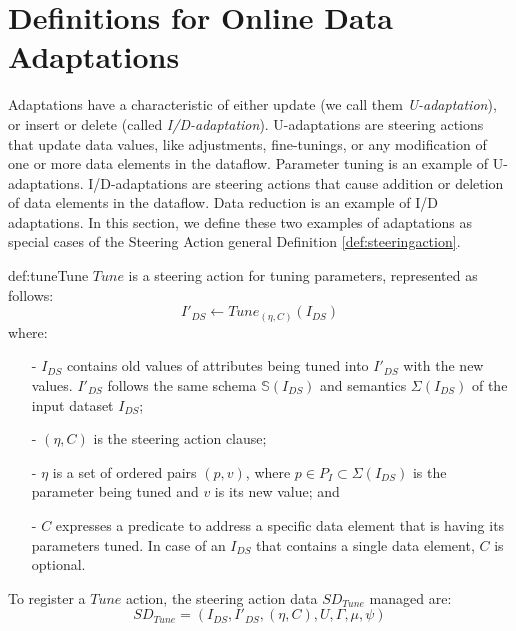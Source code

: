 \section{Definitions for Online Data Adaptations} \label{sec_online_data_adaptations}


Adaptations have a characteristic of either update (we call them \textit{U-adaptation}), or insert or delete (called \textit{I/D-adaptation}).
U-adaptations are steering actions that update data values, like adjustments, fine-tunings, or any modification of one or more data elements in the dataflow. Parameter tuning is an example of U-adaptations.
I/D-adaptations are steering actions that cause addition or deletion of data elements in the dataflow. Data reduction is an example of I/D adaptations. In this section, we define these two examples of adaptations as special cases of the Steering Action general Definition \ref{def:steeringaction}.

\begin{mydef}{def:tune}{Tune}
$Tune$ is a steering action for tuning parameters, represented as follows:
$$I'_{DS} \leftarrow Tune_{(\eta,C)}(I_{DS})$$
where:
\begin{itemize}
    \setlength\itemsep{-2mm}
    \item[-] \noindent
         $I_{DS}$ contains old values of attributes being tuned into $I'_{DS}$ with the new values.
         $I'_{DS}$ follows the same schema $\mathbb{S}(I_{DS})$ and semantics $\Sigma(I_{DS})$ of the input dataset $I_{DS}$;
    \item[-] \noindent
        $(\eta,C)$ is the steering action clause;
    \item[-] \noindent
        $\eta$ is a set of ordered pairs $(p,v)$, where $p \in P_I \subset \Sigma(I_{DS})$ is the parameter being tuned and $v$ is its new value;  and
    \item[-] \noindent
        $C$ expresses a predicate to address a specific data element that is having its parameters tuned. In case of an $I_{DS}$ that contains a single data element, $C$ is optional.
\end{itemize}

To register a $Tune$ action, the steering action data $SD_{Tune}$ managed are:
$$SD_{Tune} = (
I_{DS},
I'_{DS},
(\eta,C),
U,
\Gamma,
\mu,
\psi
)$$
\end{mydef}


